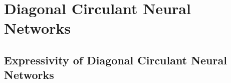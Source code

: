 \section{Diagonal Circulant Neural Networks}

\subsection{Expressivity of Diagonal Circulant Neural Networks}


%
%    
%
%


